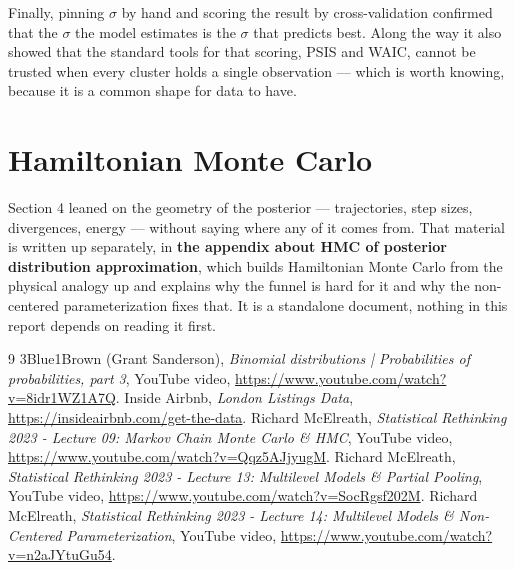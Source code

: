 \documentclass[11pt,a4paper]{article}
\begin{document}
Finally, pinning $\sigma$ by hand and scoring the result by cross-validation
confirmed that the $\sigma$ the model estimates is the $\sigma$ that predicts
best. Along the way it also showed that the standard tools for that scoring,
PSIS and WAIC, cannot be trusted when every cluster holds a single observation
--- which is worth knowing, because it is a common shape for data to have.

\appendix
\section{Hamiltonian Monte Carlo}

Section 4 leaned on the geometry of the posterior --- trajectories, step sizes,
divergences, energy --- without saying where any of it comes from. That material
is written up separately, in \textbf{the appendix about HMC of posterior distribution approximation}, which builds
Hamiltonian Monte Carlo from the physical analogy up and explains why the funnel
is hard for it and why the non-centered parameterization fixes that. It is a
standalone document, nothing in this report depends on reading it first.

\begin{thebibliography}{9}
3Blue1Brown (Grant Sanderson), \emph{Binomial distributions | Probabilities of probabilities, part 3}, YouTube video, \href{https://www.youtube.com/watch?v=8idr1WZ1A7Q\&list=PL4cNQ1YkG5WhQGmPnRe4vDUImh_nviriy\&index=3}{https://www.youtube.com/watch?v=8idr1WZ1A7Q}.
Inside Airbnb, \emph{London Listings Data}, \href{https://insideairbnb.com/get-the-data}{https://insideairbnb.com/get-the-data}.
Richard McElreath, \emph{Statistical Rethinking 2023 - Lecture 09: Markov Chain Monte Carlo \& HMC}, YouTube video, \href{https://www.youtube.com/watch?v=Qqz5AJjyugM\&list=PLDcUM9US4XdMROZ57-OIRtIK0aOynbgZN\&index=9}{https://www.youtube.com/watch?v=Qqz5AJjyugM}.
Richard McElreath, \emph{Statistical Rethinking 2023 - Lecture 13: Multilevel Models \& Partial Pooling}, YouTube video, \href{https://www.youtube.com/watch?v=SocRgsf202M\&list=PLDcUM9US4XdMROZ57-OIRtIK0aOynbgZN\&index=13}{https://www.youtube.com/watch?v=SocRgsf202M}.
Richard McElreath, \emph{Statistical Rethinking 2023 - Lecture 14: Multilevel Models \& Non-Centered Parameterization}, YouTube video, \href{https://www.youtube.com/watch?v=n2aJYtuGu54\&list=PLDcUM9US4XdMROZ57-OIRtIK0aOynbgZN\&index=14}{https://www.youtube.com/watch?v=n2aJYtuGu54}.
\end{thebibliography}
\end{document}
